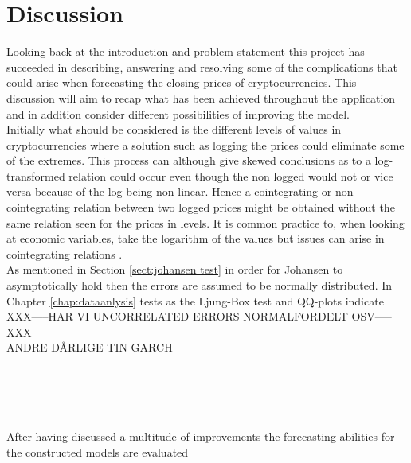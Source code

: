 \chapter{Discussion}
Looking back at the introduction and problem statement this project has succeeded in describing, answering and resolving some of the complications that could arise when forecasting the closing prices of cryptocurrencies. This discussion will aim to recap what has been achieved throughout the application and in addition consider different possibilities of improving the model.\\
Initially what should be considered is the different levels of values in cryptocurrencies where a solution such as logging the prices could eliminate some of the extremes. This process can although give skewed conclusions as to a log-transformed relation could occur even though the non logged would not or vice versa because of the log being non linear. Hence a cointegrating or non cointegrating relation between two logged prices might be obtained without the same relation seen for the prices in levels. It is common practice to, when looking at economic variables, take the logarithm of the values but issues can arise in cointegrating relations \cite{cointegrationloggedissues}.\\
As mentioned in Section \ref{sect:johansen test} in order for Johansen to asymptotically hold then the errors are assumed to be normally distributed. In Chapter \ref{chap:dataanlysis} tests as the Ljung-Box test and QQ-plots indicate XXX-----HAR VI UNCORRELATED ERRORS NORMALFORDELT OSV-----XXX\\
ANDRE DÅRLIGE TIN
GARCH

\\\\\\\\
After having discussed a multitude of improvements the forecasting abilities for the constructed models are evaluated
